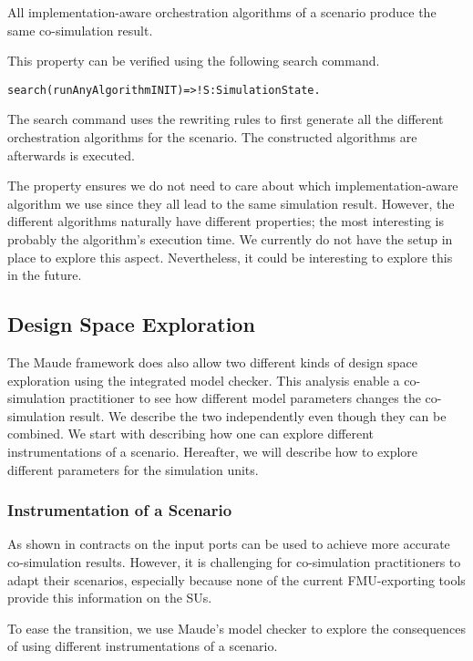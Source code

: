 \begin{lemma}
  All implementation-aware orchestration algorithms of a scenario produce the same co-simulation result.
\end{lemma}

This property can be verified using the following search command.

\begin{alltt}
  search (runAnyAlgorithm INIT)  =>! S:SimulationState . 
\end{alltt}
The search command uses the rewriting rules to first generate all the different orchestration algorithms for the scenario.
The constructed algorithms are afterwards is executed.

The property ensures we do not need to care about which implementation-aware algorithm we use since they all lead to the same simulation result.
However, the different algorithms naturally have different properties; the most interesting is probably the algorithm's execution time. 
We currently do not have the setup in place to explore this aspect.
Nevertheless, it could be interesting to explore this in the future.


\subsection{Design Space Exploration}
The Maude framework does also allow two different kinds of design space exploration using the integrated model checker.
This analysis enable a co-simulation practitioner to see how different model parameters changes the co-simulation result.
We describe the two independently even though they can be combined.
We start with describing how one can explore different instrumentations of a scenario.
Hereafter, we will describe how to explore different parameters for the simulation units.  

\subsubsection{Instrumentation of a Scenario}
As shown in \cite{Gomes2019,Oakes2021,hansen_verification_2021} contracts on the input ports can be used to achieve more accurate co-simulation results.
However, it is challenging for co-simulation practitioners to adapt their scenarios, especially because none of the current FMU-exporting tools provide this information on the SUs.

To ease the transition, we use Maude's model checker to explore the consequences of using different instrumentations of a scenario.

